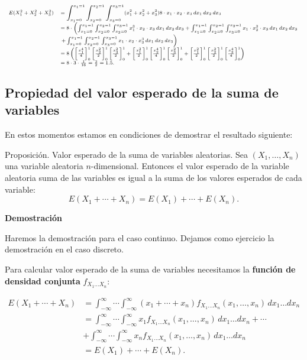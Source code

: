 \documentclass[
  letterpaper,
  DIV=11,
  numbers=noendperiod]{scrreprt}
\begin{document}
\[
\scriptsize{
\begin{array}{rl}
E(X_1^2+X_2^2+X_3^2) & \displaystyle=\int_{x_1=0}^{x_1=1} \int_{x_2=0}^{x_2=1}\int_{x_3=0}^{x_3=1} (x_1^2+x_2^2+x_3^2) 8\cdot x_1\cdot x_2\cdot  x_3 \,dx_1\, dx_2\, dx_3\\ & =8\cdot \left(\int_{x_1=0}^{x_1=1} \int_{x_2=0}^{x_2=1}\int_{x_3=0}^{x_3=1}   x_1^3\cdot  x_2\cdot  x_3 \,dx_1\, dx_2\, dx_3 + \int_{x_1=0}^{x_1=1} \int_{x_2=0}^{x_2=1}\int_{x_3=0}^{x_3=1}   x_1 \cdot x_2^3 \cdot x_3 \,dx_1\, dx_2\, dx_3 \right.\\ & \left. + \int_{x_1=0}^{x_1=1} \int_{x_2=0}^{x_2=1}\int_{x_3=0}^{x_3=1}   x_1\cdot  x_2\cdot  x_3^3 \,dx_1\, dx_2\, dx_3\right) \\ & =
8\left(\left[\frac{x_1^4}{4}\right]_0^1 \left[\frac{x_2^2}{2}\right]_0^1 \left[\frac{x_3^2}{2}\right]_0^1 + \left[\frac{x_1^2}{2}\right]_0^1 \left[\frac{x_2^4}{4}\right]_0^1 \left[\frac{x_3^2}{2}\right]_0^1 + \left[\frac{x_1^2}{2}\right]_0^1 \left[\frac{x_2^2}{2}\right]_0^1 \left[\frac{x_3^4}{4}\right]_0^1\right) \\ & =8\cdot 3\cdot \frac{1}{16}=\frac{3}{2}=1.5.
\end{array}}
\]

\hypertarget{propiedad-del-valor-esperado-de-la-suma-de-variables}{%
\subsection{Propiedad del valor esperado de la suma de
variables}\label{propiedad-del-valor-esperado-de-la-suma-de-variables}}

En estos momentos estamos en condiciones de demostrar el resultado
siguiente:

Proposición. Valor esperado de la suma de variables aleatorias. Sea
\((X_1,\ldots,X_n)\) una variable aleatoria \(n\)-dimensional. Entonces
el valor esperado de la variable aleatoria suma de las variables es
igual a la suma de los valores esperados de cada variable: \[
E(X_1+\cdots + X_n)=E(X_1)+\cdots + E(X_n).
\]

\textbf{Demostración}

Haremos la demostración para el caso continuo. Dejamos como ejercicio la
demostración en el caso discreto.

Para calcular valor esperado de la suma de variables necesitamos la
\textbf{función de densidad conjunta} \(f_{X_1\ldots X_n}\):

\[
\begin{array}{rl}
E(X_1+\cdots + X_n) & = \int_{-\infty}^\infty\cdots\int_{-\infty}^\infty (x_1+\cdots + x_n)f_{X_1\ldots X_n}(x_1,\ldots,x_n)\,dx_1\ldots dx_n \\ & = \int_{-\infty}^\infty\cdots\int_{-\infty}^\infty x_1f_{X_1\ldots X_n}(x_1,\ldots,x_n)\,dx_1\ldots dx_n+ \cdots \\ & + \int_{-\infty}^\infty\cdots\int_{-\infty}^\infty x_n f_{X_1\ldots X_n}(x_1,\ldots,x_n)\,dx_1\ldots dx_n \\ & = E(X_1)+\cdots + E(X_n).
\end{array}
\]
\end{document}
